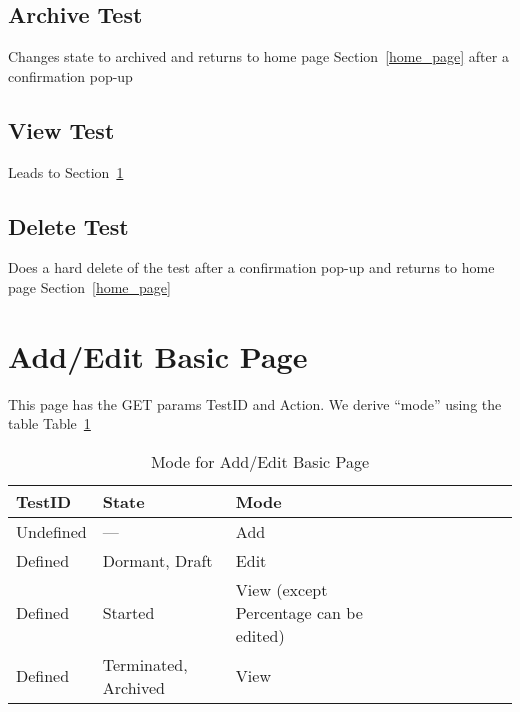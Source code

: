 \documentclass[letterpaper]{article}
\begin{document}
\subsection{Archive Test}
\label{archive_test}

Changes state to archived and returns to home page Section~\ref{home_page} after
a confirmation pop-up

\subsection{View Test}
\label{view_test}
Leads to Section~\ref{add_edit_basic_page}

\subsection{Delete Test}
\label{del_test}

Does a hard delete of the test after a confirmation pop-up
and returns to home page Section~\ref{home_page}


\section{Add/Edit Basic Page}
\label{add_edit_basic_page}
This page has the GET params TestID and Action. We derive ``mode'' using the
table Table~\ref{tbl_mode}
\begin{table}[hb]
\centering
\begin{tabular}{|l||l|l|l|l|l|l|l|l|}  \hline \hline
{\bf TestID} & {\bf State} & {\bf Mode} \\ \hline
Undefined     & --- & Add \\ \hline
Defined & Dormant, Draft & Edit \\ \hline
Defined & Started & View (except Percentage can be edited)\\ \hline
Defined & Terminated, Archived & View \\ \hline
\hline
\end{tabular}
\caption{Mode for Add/Edit Basic Page}
\label{tbl_mode}
\end{table}
\end{document}

